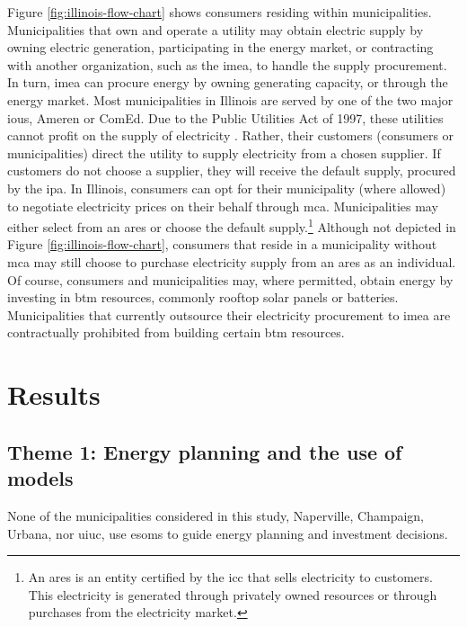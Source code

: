 Figure \ref{fig:illinois-flow-chart} shows consumers residing within
municipalities. Municipalities that own and operate a utility may obtain
electric supply by owning electric generation, participating in the energy
market, or contracting with another organization, such as the \ac{imea}, to
handle the supply procurement. In turn, \ac{imea} can procure energy by owning
generating capacity, or through the energy market. Most municipalities in
Illinois are served by one of the two major \acp{iou}, Ameren or ComEd. Due to
the Public Utilities Act of 1997, these utilities cannot profit on the supply of
electricity \cite{illinois_90th_general_assembly_electric_1997}. Rather, their
customers (consumers or municipalities) direct the utility to supply electricity
from a chosen supplier. If customers do not choose a supplier, they will receive
the default supply, procured by the \ac{ipa}. In Illinois, consumers can opt for
their municipality (where allowed) to negotiate electricity prices on their
behalf through \ac{mca}. Municipalities may either select from an \ac{ares} or
choose the default supply.\footnote{An \ac{ares} is an entity certified by the
\ac{icc} that sells electricity to customers. This electricity is generated
through privately owned resources or through purchases from the electricity
market.} Although not depicted in Figure \ref{fig:illinois-flow-chart},
consumers that reside in a municipality without \ac{mca} may still choose to
purchase electricity supply from an \ac{ares} as an individual. Of course,
consumers and municipalities may, where permitted, obtain energy by investing in
\ac{btm} resources, commonly rooftop solar panels or batteries. Municipalities
that currently outsource their electricity procurement to \ac{imea} are
contractually prohibited from building certain \ac{btm} resources.

\section{Results}

\subsection{Theme 1: Energy planning and the use of models}

None of the municipalities considered in this study, Naperville, Champaign,
Urbana, nor \ac{uiuc}, use \acp{esom} to guide energy planning and investment
decisions.  



